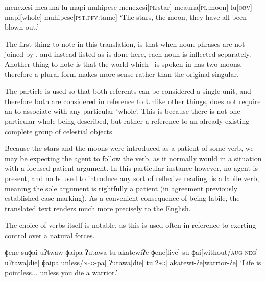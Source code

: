 \ex
\begingl
\glpreamble menexesi meauna lu mapi muhipese
\endpreamble
\nogloss{\lbrack}
menexesi[\textsc{pl:}star]
meauna[\textsc{pl:}moon]
lu[\textsc{obv}]
mapi[whole]
\nogloss{\rbrack}
muhipese[\textsc{pst.pfv:}tame]
\glft `The stars, the moon, they have all been blown out.'\\
\endgl
\xe

The first thing to note in this translation, is that when noun phrases are not joined by , and instead listed as is done here, each noun is inflected separately.
Another thing to note is that the world which \langname\ is spoken in has two moons, therefore a plural form makes more sense rather than the original singular.

The particle  is used so that both referents can be considered a single unit, and therefore both are considered in reference to 
Unlike other things,  does not require an  to associate  with any particular `whole'.
This is because there is not one particular whole being described, but rather a reference to an already existing complete group of celestial objects.

Because the stars and the moons were introduced as a patient of some verb, we may be expecting the agent to follow the verb, as it normally would in a situation with a focused patient argument.
In this particular instance however, no agent is present, and no  Is used to introduce any sort of reflexive reading.
 is a labile verb, meaning the sole argument is rightfully a patient (in agreement previously established case marking).
As a convenient consequence of  being labile, the translated text renders much more precisely to the English.

The choice of verbs itself is notable, as this is used often in reference to exerting control over a natural forces.

\ex
\begingl
\glpreamble ɸene suɸai uʔtwaw ɸaipa ʔutawa tu akatewiʔe
\endpreamble
ɸene[live]
su-ɸai[without/\textsc{aug-neg}]
uʔtawa[die]
ɸaipa[unless/\textsc{neg-}pa\footnotemark]
ʔutawa[die]
tu[\textsc{2sg}]
akatewi-ʔe[warrior-ʔe]
\glft `Life is pointless... unless you die a warrior.'\\
\endgl
\xe

